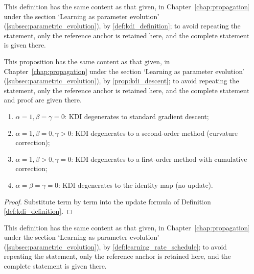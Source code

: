 \begin{definition}\label{def:kdi_definition_ps}
This definition has the same content as that given, in Chapter~\ref{chap:propagation} under the section `Learning as parameter evolution' (\cref{subsec:parametric_evolution}), by \cref{def:kdi_definition}; to avoid repeating the statement, only the reference anchor is retained here, and the complete statement is given there.
\end{definition}

\begin{proposition}\label{prop:kdi_descent_ps}
This proposition has the same content as that given, in Chapter~\ref{chap:propagation} under the section `Learning as parameter evolution' (\cref{subsec:parametric_evolution}), by \cref{prop:kdi_descent}; to avoid repeating the statement, only the reference anchor is retained here, and the complete statement and proof are given there.
\end{proposition}

\begin{property}\label{prop:kdi_degenerations}
\begin{enumerate}[label=(\roman*)]
    \item $\alpha=1,\beta=\gamma=0$: KDI degenerates to standard gradient descent;
    \item $\alpha=1,\beta=0,\gamma>0$: KDI degenerates to a second-order method (curvature correction);
    \item $\alpha=1,\beta>0,\gamma=0$: KDI degenerates to a first-order method with cumulative correction;
    \item $\alpha=\beta=\gamma=0$: KDI degenerates to the identity map (no update).
\end{enumerate}
\end{property}

\begin{proof}
Substitute term by term into the update formula of Definition \ref{def:kdi_definition}.
\end{proof}

\begin{definition}\label{def:learning_rate_schedule_ps}
This definition has the same content as that given, in Chapter~\ref{chap:propagation} under the section `Learning as parameter evolution' (\cref{subsec:parametric_evolution}), by \cref{def:learning_rate_schedule}; to avoid repeating the statement, only the reference anchor is retained here, and the complete statement is given there.
\end{definition}

